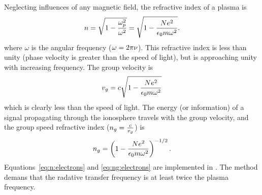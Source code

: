 Neglecting influences of any magnetic field, the refractive index of a plasma
is \citep[e.g.][]{rybicki:radia:79}
\begin{equation}
\label{eq:n:electrons}
n =\sqrt{1-\frac{\omega_{p}^{2}}{\omega^{2}}}=\sqrt{1-\frac{Ne^{2}}
{\epsilon_{0}m\omega^{2}}}.
\end{equation}
where $\omega$ is the angular frequency ($\omega=2\pi\nu$). This refractive
index is less than unity (phase velocity is greater than the speed of light),
but is approaching unity with increasing frequency. The group velocity is
\citep{rybicki:radia:79}
\begin{equation}
v_{g}=c\sqrt{1-\frac{Ne^{2}}
{\epsilon_{0}m\omega^{2}}}
\end{equation}
which is clearly less than the speed of light.
The energy (or information) of a signal propagating through the ionosphere
travels with the group velocity, and the group speed refractive
index (\(n_{g}=\frac{c}{v_{g}}\)) is
\begin{equation}
\label{eq:ng:electrons}
  n_{g}=\left(
    1-\frac{Ne^{2}}
    {\epsilon_{0}m\omega^{2}}
  \right)^{-1/2}.
\end{equation}
Equations~\ref{eq:n:electrons} and \ref{eq:ng:electrons} are implemented in
. The method demans that the radative
transfer frequency is at least twice the plasma frequency.


